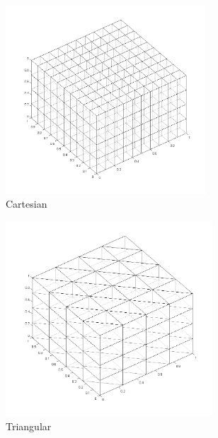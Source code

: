 \begin{figure}
\centering
	\begin{subfigure}[b]{0.5\textwidth}
		\centering
		\includegraphics[width=0.82\textwidth]{figures/sec_DSA/SIP_cart_extruded_mesh.png}
		\caption{Cartesian}
	\end{subfigure}
	\vfill
	\begin{subfigure}[b]{0.45\textwidth}
		\centering
		\includegraphics[width=0.85\textwidth]{figures/sec_DSA/SIP_tri_extruded_mesh.png}
		\caption{Triangular}
	\end{subfigure}
	\hfill
	\begin{subfigure}[b]{0.45\textwidth}

\end{subfigure}
\end{figure}
